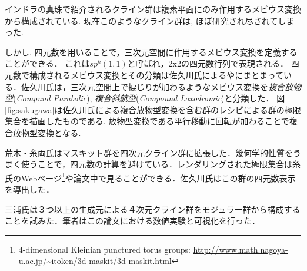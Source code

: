 インドラの真珠で紹介されるクライン群は複素平面にのみ作用するメビウス変換から構成されている.
現在このようなクライン群は, ほぼ研究され尽されてしまった.

しかし, 四元数を用いることで，三次元空間に作用するメビウス変換を定義することができる．
これは$sp^k(1, 1)$と呼ばれ，2x2の四元数行列で表現される．
四元数で構成されるメビウス変換とその分類は佐久川氏による\cite{sakugawaMaster}や\cite{accidentalParabolic}にまとまっている．佐久川氏は，三次元空間上で捩じりが加わるようなメビウス変換を\emph{複合放物型}({\it Compund Parabolic}), \emph{複合斜航型}({\it Compound Loxodromic})と分類した．
図\ref{fig:sakugawa}は佐久川氏による複合放物型変換を含む群のレシピによる群の極限集合を描画したものである.
放物型変換である平行移動に回転が加わることで複合放物型変換となる.

荒木・糸両氏はマスキット群を四次元クライン群に拡張した\cite{maskit}．幾何学的性質をうまく使うことで，四元数の計算を避けている．レンダリングされた極限集合は糸氏のWebページ\footnote{4-dimensional Kleinian punctured torus groups: \url{http://www.math.nagoya-u.ac.jp/~itoken/3d-maskit/3d-maskit.html}}や論文中で見ることができる．佐久川氏はこの群の四元数表示を導出した\cite{sakugawa4d}．

三浦氏は３つ以上の生成元による４次元クライン群をモジュラー群から構成することを試みた\cite{miura}．筆者はこの論文における数値実験と可視化を行った．


